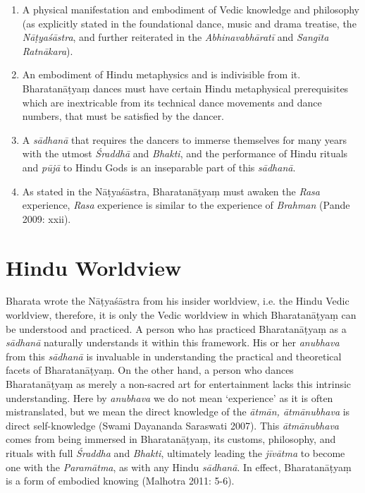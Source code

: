 \begin{enumerate}[{\rm 1)}]
\itemsep=0pt
\item A physical manifestation and embodiment of Vedic knowledge and philosophy (as explicitly stated in the foundational dance, music and drama treatise, the \textit{Nāṭyaśāstra}, and further reiterated in the \textit{Abhinavabhāratī} and \textit{Sangīta Ratnākara}).

 \item An embodiment of Hindu metaphysics and is indivisible from it. Bharatanāṭyaṃ dances must have certain Hindu metaphysical prerequisites which are inextricable from its technical dance movements and dance numbers, that must be satisfied by the dancer.

 \item A \textit{sādhanā} that requires the dancers to immerse themselves for many years with the utmost \textit{Śraddhā} and \textit{Bhakti}, and the performance of Hindu rituals and \textit{pūjā} to Hindu Gods is an inseparable part of this \textit{sādhanā}.

 \item As stated in the Nāṭyaśāstra, Bharatanāṭyaṃ must awaken the \textit{Rasa} experience, \textit{Rasa} experience is similar to the experience of \textit{Brahman} (Pande 2009: xxii).

\end{enumerate}


\section*{Hindu Worldview}

Bharata wrote the Nāṭyaśāstra from his insider worldview, i.e. the Hindu Vedic worldview, therefore, it is only the Vedic worldview in which Bharatanāṭyaṃ can be understood and practiced. A person who has practiced Bharatanāṭyaṃ as a \textit{sādhanā }naturally understands it within this framework. His or her \textit{anubhava }from this\textit{ sādhanā }is invaluable in understanding the practical and theoretical facets of Bharatanāṭyaṃ. On the other hand, a person who dances Bharatanāṭyaṃ as merely a non-sacred art for entertainment lacks this intrinsic understanding. Here by \textit{anubhava} we do not mean ‘experience’ as it is often mistranslated, but we mean the direct knowledge of the \textit{ātmān, ātmānubhava }is direct self-knowledge (Swami Dayananda Saraswati 2007). This \textit{ātmānubhava} comes from being immersed in Bharatanāṭyaṃ, its customs, philosophy, and rituals with full \textit{Śraddha} and \textit{Bhakti}, ultimately leading the \textit{jīvātma} to become one with the \textit{Paramātma}, as with any Hindu \textit{sādhanā}. In effect, Bharatanāṭyaṃ is a form of embodied knowing (Malhotra 2011: 5-6).


